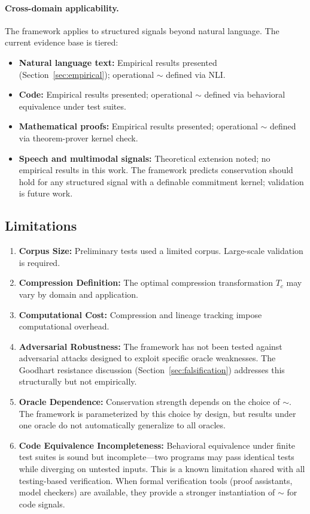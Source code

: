 \documentclass[11pt,a4paper]{article}
\begin{document}
\paragraph{Cross-domain applicability.}
The framework applies to structured signals beyond natural language. The current evidence base is tiered:
\begin{itemize}
    \item \textbf{Natural language text:} Empirical results presented (Section~\ref{sec:empirical}); operational $\sim$ defined via NLI.
    \item \textbf{Code:} Empirical results presented; operational $\sim$ defined via behavioral equivalence under test suites.
    \item \textbf{Mathematical proofs:} Empirical results presented; operational $\sim$ defined via theorem-prover kernel check.
    \item \textbf{Speech and multimodal signals:} Theoretical extension noted; no empirical results in this work. The framework predicts conservation should hold for any structured signal with a definable commitment kernel; validation is future work.
\end{itemize}

\subsection{Limitations}

\begin{enumerate}
    \item \textbf{Corpus Size:} Preliminary tests used a limited corpus. Large-scale validation is required.

    \item \textbf{Compression Definition:} The optimal compression transformation $T_c$ may vary by domain and application.

    \item \textbf{Computational Cost:} Compression and lineage tracking impose computational overhead.

    \item \textbf{Adversarial Robustness:} The framework has not been tested against adversarial attacks designed to exploit specific oracle weaknesses. The Goodhart resistance discussion (Section~\ref{sec:falsification}) addresses this structurally but not empirically.

    \item \textbf{Oracle Dependence:} Conservation strength depends on the choice of $\sim$. The framework is parameterized by this choice by design, but results under one oracle do not automatically generalize to all oracles.

    \item \textbf{Code Equivalence Incompleteness:} Behavioral equivalence under finite test suites is sound but incomplete---two programs may pass identical tests while diverging on untested inputs. This is a known limitation shared with all testing-based verification. When formal verification tools (proof assistants, model checkers) are available, they provide a stronger instantiation of $\sim$ for code signals.
\end{enumerate}
\end{document}
